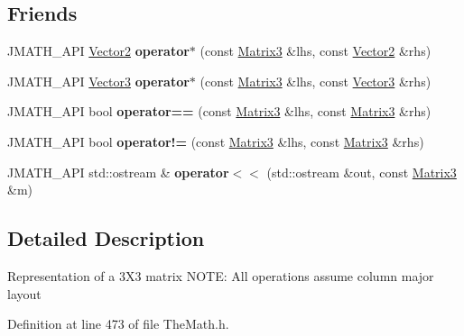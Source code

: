 \subsection*{Friends}
\begin{DoxyCompactItemize}
\item 
\hypertarget{class_matrix3_a034bd3a7cc15becc9c64a5e0f0634b37}{J\+M\+A\+T\+H\+\_\+\+A\+P\+I \hyperlink{class_vector2}{Vector2} {\bfseries operator$\ast$} (const \hyperlink{class_matrix3}{Matrix3} \&lhs, const \hyperlink{class_vector2}{Vector2} \&rhs)}\label{class_matrix3_a034bd3a7cc15becc9c64a5e0f0634b37}

\item 
\hypertarget{class_matrix3_a2d40ac8d30d152c47b3c1281ec3a81fb}{J\+M\+A\+T\+H\+\_\+\+A\+P\+I \hyperlink{class_vector3}{Vector3} {\bfseries operator$\ast$} (const \hyperlink{class_matrix3}{Matrix3} \&lhs, const \hyperlink{class_vector3}{Vector3} \&rhs)}\label{class_matrix3_a2d40ac8d30d152c47b3c1281ec3a81fb}

\item 
\hypertarget{class_matrix3_a88b91edded59b5f01661169a0708b593}{J\+M\+A\+T\+H\+\_\+\+A\+P\+I bool {\bfseries operator==} (const \hyperlink{class_matrix3}{Matrix3} \&lhs, const \hyperlink{class_matrix3}{Matrix3} \&rhs)}\label{class_matrix3_a88b91edded59b5f01661169a0708b593}

\item 
\hypertarget{class_matrix3_a55de7f770ec1e2fabf6a3a5685f09280}{J\+M\+A\+T\+H\+\_\+\+A\+P\+I bool {\bfseries operator!=} (const \hyperlink{class_matrix3}{Matrix3} \&lhs, const \hyperlink{class_matrix3}{Matrix3} \&rhs)}\label{class_matrix3_a55de7f770ec1e2fabf6a3a5685f09280}

\item 
\hypertarget{class_matrix3_a857a2693f4ab1cd8eca197d4243cf69a}{J\+M\+A\+T\+H\+\_\+\+A\+P\+I std\+::ostream \& {\bfseries operator$<$$<$} (std\+::ostream \&out, const \hyperlink{class_matrix3}{Matrix3} \&m)}\label{class_matrix3_a857a2693f4ab1cd8eca197d4243cf69a}

\end{DoxyCompactItemize}


\subsection{Detailed Description}
Representation of a 3\+X3 matrix N\+O\+T\+E\+: All operations assume column major layout 

Definition at line 473 of file The\+Math.\+h.



